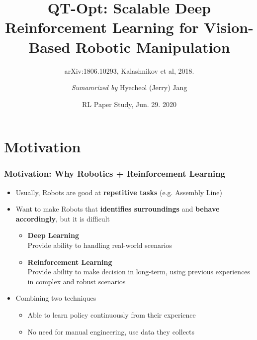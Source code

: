 \documentclass{beamer}
\title{QT-Opt: Scalable Deep Reinforcement Learning for Vision-Based Robotic Manipulation}
\subtitle{arXiv:1806.10293, Kalashnikov et al, 2018.}
\author{\textit{Sumamrized by} Hyecheol (Jerry) Jang}
\institute{
  Department of Computer Sciences\\
  University of Wisconsin–Madison
}
\date{RL Paper Study, Jun. 29. 2020}
\newcommand{\firstSec}{Motivation}
\begin{document}
  \frame{\titlepage}

  \section{\firstSec}
    \begin{frame}
      \frametitle{\firstSec : Why Robotics + Reinforcement Learning}
      \begin{itemize}
        \item Usually, Robots are good at \textbf{repetitive tasks} (e.g. Assembly Line)
              \pause
        \item Want to make Robots that \textbf{identifies surroundings} and \textbf{behave accordingly},
              but it is difficult
              \pause
        \begin{itemize}
          \item \textbf{Deep Learning}\\
                Provide ability to handling real-world scenarios
          \item \textbf{Reinforcement Learning}\\
                Provide ability to make decision in long-term,
                using previous experiences in complex and robust scenarios
        \end{itemize}
        \pause
        \item Combining two techniques
        \begin{itemize}
          \item Able to learn policy continuously from their experience
          \item No need for manual engineering, use data they collects
        \end{itemize}
      \end{itemize}
    \end{frame}
\end{document}
